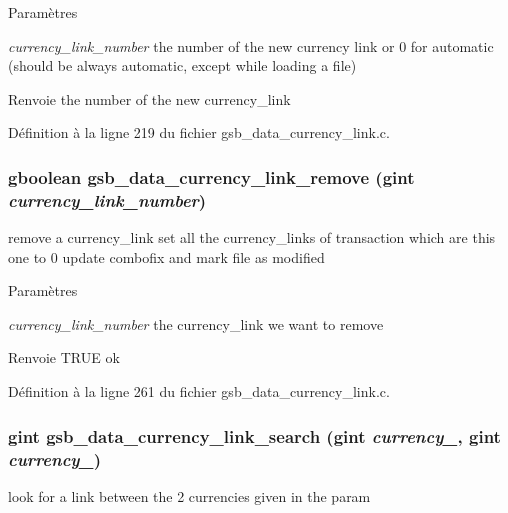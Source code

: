 \begin{DoxyParams}{Paramètres}
\item[{\em currency\_\-link\_\-number}]the number of the new currency link or 0 for automatic (should be always automatic, except while loading a file)\end{DoxyParams}
\begin{DoxyReturn}{Renvoie}
the number of the new currency\_\-link 
\end{DoxyReturn}


Définition à la ligne 219 du fichier gsb\_\-data\_\-currency\_\-link.c.

\subsubsection[{gsb\_\-data\_\-currency\_\-link\_\-remove}]{\setlength{\rightskip}{0pt plus 5cm}gboolean gsb\_\-data\_\-currency\_\-link\_\-remove (gint {\em currency\_\-link\_\-number})}\label{gsb__data__currency__link_8c_af6a6a897e207d9a9d1627640a96ade55}
remove a currency\_\-link set all the currency\_\-links of transaction which are this one to 0 update combofix and mark file as modified


\begin{DoxyParams}{Paramètres}
\item[{\em currency\_\-link\_\-number}]the currency\_\-link we want to remove\end{DoxyParams}
\begin{DoxyReturn}{Renvoie}
TRUE ok 
\end{DoxyReturn}


Définition à la ligne 261 du fichier gsb\_\-data\_\-currency\_\-link.c.

\subsubsection[{gsb\_\-data\_\-currency\_\-link\_\-search}]{\setlength{\rightskip}{0pt plus 5cm}gint gsb\_\-data\_\-currency\_\-link\_\-search (gint {\em currency\_}, \/  gint {\em currency\_})}\label{gsb__data__currency__link_8c_ae1bb872fddbad3052301ba8ef1b1e9bb}
look for a link between the 2 currencies given in the param


